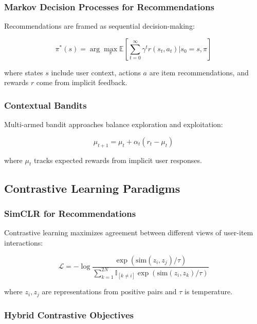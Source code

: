 \subsubsection{Markov Decision Processes for Recommendations}

Recommendations are framed as sequential decision-making:

\begin{equation}
\pi^*(s) = \arg\max_\pi \mathbb{E}\left[\sum_{t=0}^\infty \gamma^t r(s_t, a_t) \bigg| s_0 = s, \pi\right]
\label{eq:rl_mdp}
\end{equation}

where states $s$ include user context, actions $a$ are item recommendations, and rewards $r$ come from implicit feedback.

\subsubsection{Contextual Bandits}

Multi-armed bandit approaches balance exploration and exploitation:

\begin{equation}
\mu_{t+1} = \mu_t + \alpha_t (r_t - \mu_t)
\label{eq:bandit_update}
\end{equation}

where $\mu_t$ tracks expected rewards from implicit user responses.

\subsection{Contrastive Learning Paradigms}

\subsubsection{SimCLR for Recommendations}

Contrastive learning maximizes agreement between different views of user-item interactions:

\begin{equation}
\mathcal{L} = -\log \frac{\exp(\text{sim}(z_i, z_j)/\tau)}{\sum_{k=1}^{2N} \mathbb{I}_{[k \neq i]} \exp(\text{sim}(z_i, z_k)/\tau)}
\label{eq:contrastive}
\end{equation}

where $z_i, z_j$ are representations from positive pairs and $\tau$ is temperature.

\subsubsection{Hybrid Contrastive Objectives}

